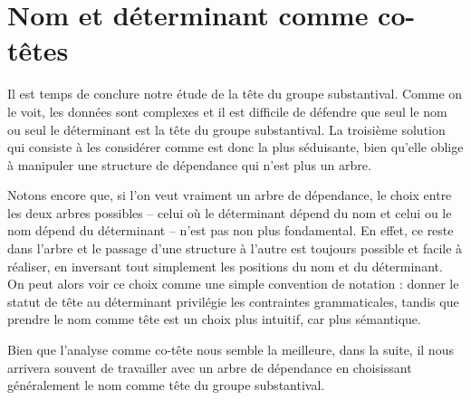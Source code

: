 \section{Nom et déterminant comme co-têtes}\label{sec:3.3.27}

Il est temps de conclure notre étude de la tête du groupe substantival. Comme on le voit, les données sont complexes et il est difficile de défendre que seul le nom ou seul le déterminant est la tête du groupe substantival. La troisième solution qui consiste à les considérer comme  est donc la plus séduisante, bien qu’elle oblige à manipuler une structure de dépendance qui n’est plus un arbre.

Notons encore que, si l’on veut vraiment un arbre de dépendance, le choix entre les deux arbres possibles – celui où le déterminant dépend du nom et celui ou le nom dépend du déterminant – n’est pas non plus fondamental. En effet, ce  reste  dans l’arbre et le passage d’une structure à l’autre est toujours possible et facile à réaliser, en inversant tout simplement les positions du nom et du déterminant. On peut alors voir ce choix comme une simple convention de notation : donner le statut de tête au déterminant privilégie les contraintes grammaticales, tandis que prendre le nom comme tête est un choix plus intuitif, car plus sémantique.

Bien que l’analyse comme co-tête nous semble la meilleure, dans la suite, il nous arrivera souvent de travailler avec un arbre de dépendance en choisissant généralement le nom comme tête du groupe substantival.

